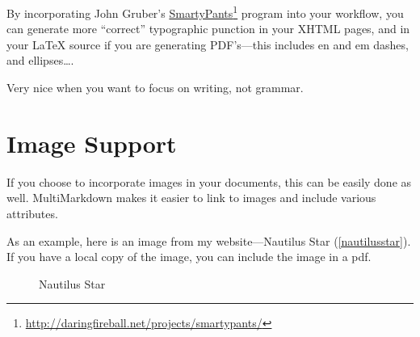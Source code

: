 \documentclass[oneside,article]{memoir}
\begin{document}
By incorporating John Gruber's \href{http://daringfireball.net/projects/smartypants/}{SmartyPants}\footnote{\href{http://daringfireball.net/projects/smartypants/}{http://daringfireball.net/projects/smartypants/}} program into your workflow, you
can generate more ``correct'' typographic punction in your XHTML pages, and in
your LaTeX source if you are generating PDF's---this includes en and em
dashes, and ellipses{\ldots}.


Very nice when you want to focus on writing, not grammar.


\section{Image Support}
\label{imagesupport}

If you choose to incorporate images in your documents, this can be easily done
as well. MultiMarkdown makes it easier to link to images and include various
attributes.


As an example, here is an image from my website---Nautilus Star (\autoref{nautilusstar}).  If you have a local copy of the image, you can include
the image in a pdf.


\begin{figure}
\begin{center}
\end{center}
\caption{Nautilus Star}
	\label{nautilusstar}
\end{figure}
\end{document}
